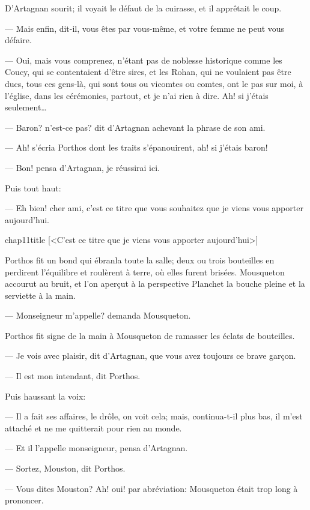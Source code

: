 D'Artagnan sourit; il voyait le défaut de la cuirasse, et il apprêtait le coup.

— Mais enfin, dit-il, vous êtes par vous-même, et votre femme ne peut vous défaire.

— Oui, mais vous comprenez, n'étant pas de noblesse historique comme les Coucy, qui se contentaient d'être sires, et les Rohan, qui ne voulaient pas être ducs, tous ces gens-là, qui sont tous ou vicomtes ou comtes, ont le pas sur moi, à l'église, dans les cérémonies, partout, et je n'ai rien à dire. Ah! si j'étais seulement\dots

— Baron? n'est-ce pas? dit d'Artagnan achevant la phrase de son ami.

— Ah! s'écria Porthos dont les traits s'épanouirent, ah! si j'étais baron!

— Bon! pensa d'Artagnan, je réussirai ici.

Puis tout haut:

— Eh bien! cher ami, c'est ce titre que vous souhaitez que je viens vous apporter aujourd'hui.

\begin{bwbigpic}
	[\basicscale] 
	{chap11title}
	[<C'est ce titre que je viens vous apporter aujourd'hui>]
\end{bwbigpic}

Porthos fit un bond qui ébranla toute la salle; deux ou trois bouteilles en perdirent l'équilibre et roulèrent à terre, où elles furent brisées. Mousqueton accourut au bruit, et l'on aperçut à la perspective Planchet la bouche pleine et la serviette à la main.

— Monseigneur m'appelle? demanda Mousqueton.

Porthos fit signe de la main à Mousqueton de ramasser les éclats de bouteilles.

— Je vois avec plaisir, dit d'Artagnan, que vous avez toujours ce brave garçon.

— Il est mon intendant, dit Porthos.

Puis haussant la voix:

— Il a fait ses affaires, le drôle, on voit cela; mais, continua-t-il plus bas, il m'est attaché et ne me quitterait pour rien au monde.

— Et il l'appelle monseigneur, pensa d'Artagnan.

— Sortez, Mouston, dit Porthos.

— Vous dites Mouston? Ah! oui! par abréviation: Mousqueton était trop long à prononcer.

